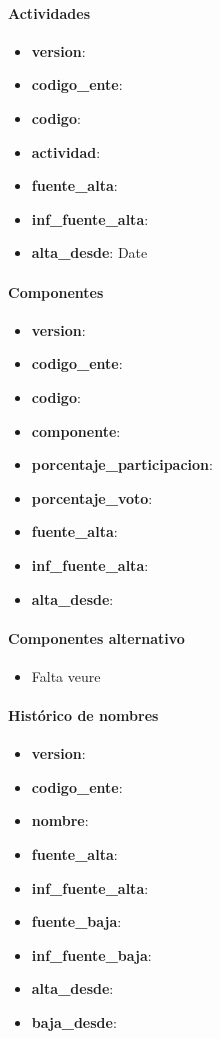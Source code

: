 \documentclass[12pt]{article}
\begin{document}
\paragraph{Actividades\\}
\begin{itemize}
    \item \textbf{version}:
    \item \textbf{codigo\_ente}:
    \item \textbf{codigo}:
    \item \textbf{actividad}:
    \item \textbf{fuente\_alta}:
    \item \textbf{inf\_fuente\_alta}:
    \item \textbf{alta\_desde}: Date
\end{itemize}

\paragraph{Componentes\\}
\begin{itemize}
    \item \textbf{version}:
    \item \textbf{codigo\_ente}:
    \item \textbf{codigo}:
    \item \textbf{componente}:
    \item \textbf{porcentaje\_participacion}:
    \item \textbf{porcentaje\_voto}:
    \item \textbf{fuente\_alta}:
    \item \textbf{inf\_fuente\_alta}:
    \item \textbf{alta\_desde}:
\end{itemize}

\paragraph{Componentes alternativo\\}
\begin{itemize}
    \item Falta veure
\end{itemize}

\paragraph{Histórico de nombres\\}
\begin{itemize}
    \item \textbf{version}:
    \item \textbf{codigo\_ente}:
    \item \textbf{nombre}:
    \item \textbf{fuente\_alta}:
    \item \textbf{inf\_fuente\_alta}:
    \item \textbf{fuente\_baja}:
    \item \textbf{inf\_fuente\_baja}:
    \item \textbf{alta\_desde}:
    \item \textbf{baja\_desde}:
\end{itemize}
\end{document}
